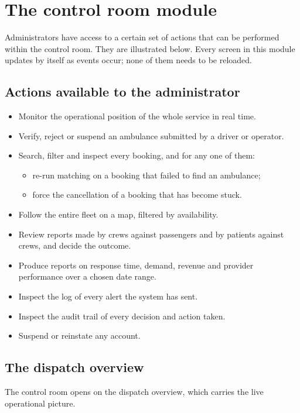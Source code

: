 \documentclass[11pt,a4paper]{article}
\begin{document}
\section{The control room module}
\label{sec:control}

Administrators have access to a certain set of actions that can be performed
within the control room. They are illustrated below. Every screen in this module
updates by itself as events occur; none of them needs to be reloaded.

\subsection{Actions available to the administrator}

\begin{itemize}
  \item Monitor the operational position of the whole service in real time.
  \item Verify, reject or suspend an ambulance submitted by a driver or operator.
  \item Search, filter and inspect every booking, and for any one of them:
    \begin{itemize}
      \item re-run matching on a booking that failed to find an ambulance;
      \item force the cancellation of a booking that has become stuck.
    \end{itemize}
  \item Follow the entire fleet on a map, filtered by availability.
  \item Review reports made by crews against passengers and by patients against
        crews, and decide the outcome.
  \item Produce reports on response time, demand, revenue and provider
        performance over a chosen date range.
  \item Inspect the log of every alert the system has sent.
  \item Inspect the audit trail of every decision and action taken.
  \item Suspend or reinstate any account.
\end{itemize}

\subsection{The dispatch overview}

The control room opens on the dispatch overview, which carries the live
operational picture.
\end{document}
